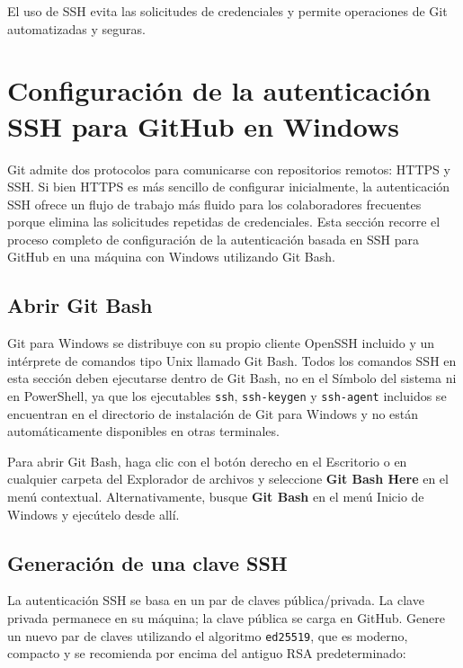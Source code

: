 El uso de SSH evita las solicitudes de credenciales y permite operaciones
de Git automatizadas y seguras.

\section{Configuración de la autenticación SSH para GitHub en Windows}
\label{sec:ssh-windows}

Git admite dos protocolos para comunicarse con repositorios remotos: HTTPS y SSH. Si bien HTTPS es más sencillo de configurar inicialmente, la autenticación SSH ofrece un flujo de trabajo más fluido para los colaboradores frecuentes porque elimina las solicitudes repetidas de credenciales. Esta sección recorre el proceso completo de configuración de la autenticación basada en SSH para GitHub en una máquina con Windows utilizando Git Bash.

\subsection{Abrir Git Bash}

Git para Windows se distribuye con su propio cliente OpenSSH incluido y un intérprete de comandos tipo Unix llamado Git Bash. Todos los comandos SSH en esta sección deben ejecutarse dentro de Git Bash, no en el Símbolo del sistema ni en PowerShell, ya que los ejecutables \texttt{ssh}, \texttt{ssh-keygen} y \texttt{ssh-agent} incluidos se encuentran en el directorio de instalación de Git para Windows y no están automáticamente disponibles en otras terminales.

Para abrir Git Bash, haga clic con el botón derecho en el Escritorio o en cualquier carpeta del Explorador de archivos y seleccione \textbf{Git Bash Here} en el menú contextual. Alternativamente, busque \textbf{Git Bash} en el menú Inicio de Windows y ejecútelo desde allí.

\subsection{Generación de una clave SSH}

La autenticación SSH se basa en un par de claves pública/privada. La clave privada permanece en su máquina; la clave pública se carga en GitHub. Genere un nuevo par de claves utilizando el algoritmo \texttt{ed25519}, que es moderno, compacto y se recomienda por encima del antiguo RSA predeterminado:

